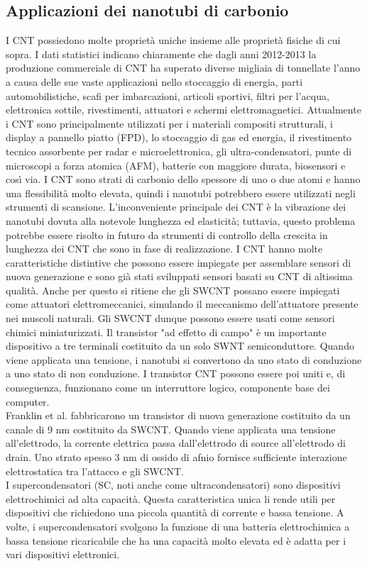 \documentclass[a4paper,titlepage]{book}
\begin{document}
\subsection{Applicazioni dei nanotubi di carbonio}
I CNT possiedono molte proprietà uniche insieme alle proprietà fisiche di cui sopra. I dati statistici indicano chiaramente che dagli anni 2012-2013 la produzione commerciale di CNT ha superato diverse migliaia di tonnellate l'anno a causa delle sue vaste applicazioni nello stoccaggio di energia, parti automobilistiche, scafi per imbarcazioni, articoli sportivi, filtri per l'acqua, elettronica sottile, rivestimenti, attuatori e schermi elettromagnetici. Attualmente i CNT sono principalmente utilizzati per i materiali compositi strutturali, i display a pannello piatto (FPD), lo stoccaggio di gas ed energia, il rivestimento tecnico assorbente per radar e microelettronica, gli ultra-condensatori, punte di microscopi a forza atomica (AFM), batterie con maggiore durata, biosensori e così via.
I CNT sono strati di carbonio dello spessore di uno o due atomi e hanno una flessibilità molto elevata, quindi i nanotubi potrebbero essere utilizzati negli strumenti di scansione.  L'inconveniente principale dei CNT è la vibrazione dei nanotubi dovuta alla notevole lunghezza ed elasticità; tuttavia, questo problema potrebbe essere risolto in futuro da strumenti di controllo della crescita in lunghezza dei CNT che sono in fase di realizzazione.
I CNT hanno molte caratteristiche distintive che possono essere impiegate per assemblare sensori di nuova generazione e sono già stati sviluppati sensori basati su CNT di altissima qualità. Anche per questo si ritiene che gli SWCNT possano essere impiegati come attuatori elettromeccanici, simulando il meccanismo dell'attuatore presente nei muscoli naturali. Gli SWCNT dunque possono essere usati come sensori chimici miniaturizzati. 
Il transistor "ad effetto di campo" è un importante dispositivo a tre terminali costituito da un solo SWNT semiconduttore. Quando viene applicata una tensione, i nanotubi si convertono da uno stato di conduzione a uno stato di non conduzione. I transistor CNT possono essere poi uniti e, di conseguenza, funzionano come un interruttore logico, componente base dei computer. \\
Franklin et al. fabbricarono un transistor di nuova generazione costituito da un canale di 9 nm costituito da SWCNT. Quando viene applicata una tensione all'elettrodo, la corrente elettrica passa dall'elettrodo di source all'elettrodo di drain. Uno strato spesso 3 nm di ossido di afnio fornisce sufficiente interazione elettrostatica tra l'attacco e gli SWCNT. \\
I supercondensatori (SC, noti anche come ultracondensatori) sono dispositivi elettrochimici ad alta capacità. Questa caratteristica unica li rende utili per dispositivi che richiedono una piccola quantità di corrente e bassa tensione. A volte, i supercondensatori svolgono la funzione di una batteria elettrochimica a bassa tensione ricaricabile che ha una capacità molto elevata ed è adatta per i vari dispositivi elettronici. 
\end{document}
